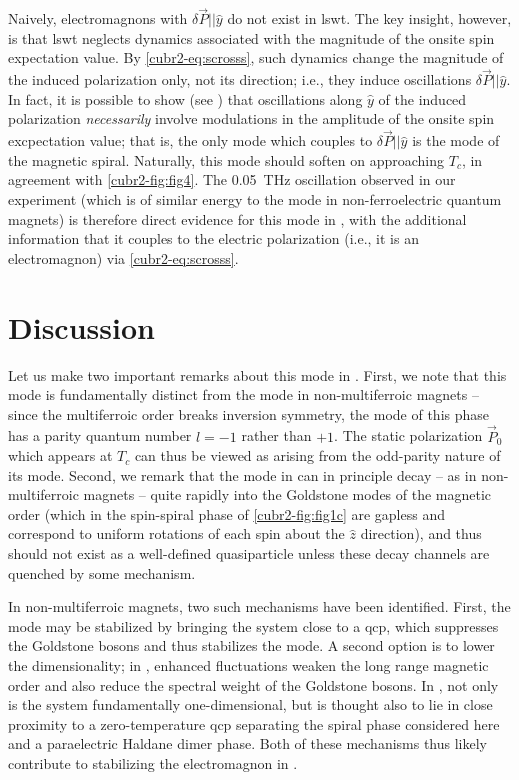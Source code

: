 Naively, electromagnons with $\delta\vec{P} || \hat{y}$ do not exist in \gls{lswt}.
The key insight, however, is that \gls{lswt} neglects dynamics associated with the magnitude of the onsite spin expectation value.
By \cref{cubr2-eq:scrosss}, such dynamics change the magnitude of the induced polarization only, not its direction; i.e., they induce oscillations $\delta\vec{P} || \hat{y}$.
In fact, it is possible to show (see ) that oscillations along $\hat{y}$ of the induced polarization \emph{necessarily} involve modulations in the amplitude of the onsite spin excpectation value; that is, the only mode which couples to $\delta\vec{P} || \hat{y}$ is the \higgs mode of the magnetic spiral.
Naturally, this mode should soften on approaching $T_c$, in agreement with \cref{cubr2-fig:fig4}.
The \qty{0.05}{THz} oscillation observed in our experiment (which is of similar energy to the \higgs mode in non-ferroelectric quantum magnets\citet{hong_higgs_2017}) is therefore direct evidence for this mode in , with the additional information that it couples to the electric polarization (i.e., it is an electromagnon) via \cref{cubr2-eq:scrosss}.

\section{Discussion}
Let us make two important remarks about this mode in .
First, we note that this mode is fundamentally distinct from the \higgs mode in non-multiferroic magnets -- since the multiferroic order breaks inversion symmetry, the \higgs mode of this phase has a parity quantum number $l=-1$ rather than $+1$.
The static polarization $\vec{P}_0$ which appears at $T_c$ can thus be viewed as arising from the odd-parity nature of its \higgs mode.
Second, we remark that the \higgs mode in  can in principle decay -- as in non-multiferroic magnets -- quite rapidly into the Goldstone modes of the magnetic order (which in the spin-spiral phase of \cref{cubr2-fig:fig1c} are gapless and correspond to uniform rotations of each spin about the $\hat{z}$ direction), and thus should not exist as a well-defined quasiparticle unless these decay channels are quenched by some mechanism.

In non-multiferroic magnets, two such mechanisms have been identified.
First, the \higgs mode may be stabilized by bringing the system close to a \gls{qcp}\cite{ruegg_quantum_2008,jain_higgs_2017,hong_higgs_2017,su_stable_2020}, which suppresses the Goldstone bosons and thus stabilizes the \higgs mode.
A second option is to lower the dimensionality\cite{canali_theory_1992,affleck_longitudinal_1992,schulz_dynamics_1996,essler_quasi-one-dimensional_1997,zhou_amplitude_2021}; in \oned, enhanced fluctuations weaken the long range magnetic order and also reduce the spectral weight of the Goldstone bosons\cite{zhou_amplitude_2021}. 
In , not only is the system fundamentally one-dimensional, but is thought also to lie in close proximity to a zero-temperature \gls{qcp}\cite{furukawa_ground-state_2012} separating the spiral phase considered here and a paraelectric Haldane dimer phase.
Both of these mechanisms thus likely contribute to stabilizing the \higgs electromagnon in .

